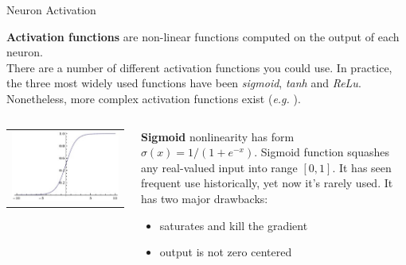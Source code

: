 \documentclass[aspectratio=169]{beamer}
\begin{document}
\begin{frame}{Neuron Activation}

\textbf{Activation functions} are non-linear functions computed on the output of each neuron.\\
There are a number of different activation functions you could use. In practice, the three most widely used functions have been \textit{sigmoid}, \textit{tanh} and \textit{ReLu}. Nonetheless, more complex activation functions exist (\emph{e.g.} \cite{he2015delving,goodfellow2013maxout}).\\
\vspace{0.8cm}
\begin{columns}
\begin{column}{0.25\textwidth}
\begin{tabular}{c}
\\
\includegraphics[width=\textwidth]{img/cnn/act_sigmoid.jpg}\\
\end{tabular}
\end{column}
\begin{column}{0.7\textwidth}
\textbf{Sigmoid} nonlinearity has form $\sigma(x) = 1 / (1 + e^{-x})$. Sigmoid function squashes any real-valued input into range $[0, 1]$. It has seen frequent use historically, yet now it's rarely used. It has two major drawbacks:
\begin{itemize}
\item saturates and kill the gradient
\item output is not zero centered
\end{itemize}
\end{column}
\end{columns}
\end{frame}
\end{document}
